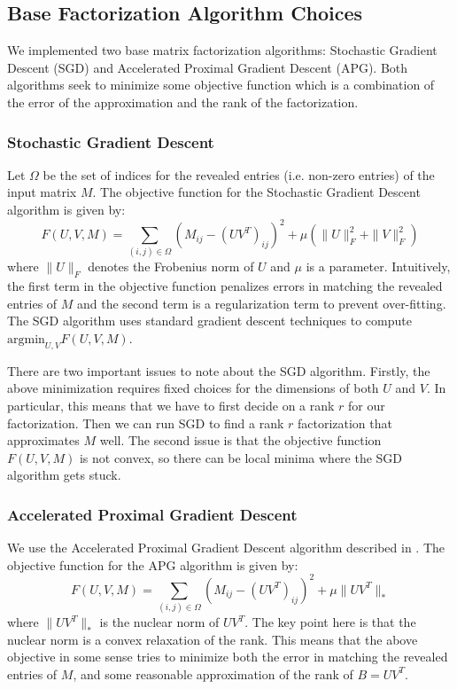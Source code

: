 \subsection{Base Factorization Algorithm Choices}
We implemented two base matrix factorization algorithms: Stochastic Gradient Descent (SGD) and Accelerated Proximal Gradient Descent (APG). Both algorithms seek to minimize some objective function which is a combination of the error of the approximation and the rank of the factorization.
\subsubsection{Stochastic Gradient Descent}
Let $\Omega$ be the set of indices for the revealed entries (i.e. non-zero entries) of the input matrix $M$. The objective function for the Stochastic Gradient Descent algorithm is given by:
\[
F(U,V,M) = \sum_{(i,j)\in \Omega} \left(M_{ij} - (UV^T)_{ij}\right)^2 + \mu (\| U\|^2_F  + \| V\|^2_F)
\]
where $\|U\|_F$ denotes the Frobenius norm of $U$ and $\mu$ is a parameter. Intuitively, the first term in the objective function penalizes errors in matching the revealed entries of $M$ and the second term is a regularization term to prevent over-fitting. The SGD algorithm uses standard gradient descent techniques to compute $\mbox{argmin}_{U,V} F(U,V,M)$. 

There are two important issues to note about the SGD algorithm. Firstly, the above minimization requires fixed choices for the dimensions of both $U$ and $V$. In particular, this means that we have to first decide on a rank $r$ for our factorization. Then we can run SGD to find a rank $r$ factorization that approximates $M$ well. The second issue is that the objective function $F(U,V,M)$ is not convex, so there can be local minima where the SGD algorithm gets stuck.

\subsubsection{Accelerated Proximal Gradient Descent}
We use the Accelerated Proximal Gradient Descent algorithm described in \cite{APGPaper}. The objective function for the APG algorithm is given by:
\[
F(U,V,M) = \sum_{(i,j)\in \Omega} \left(M_{ij} - (UV^T)_{ij}\right)^2 + \mu \| UV^T\|_*
\]
where $\|UV^T\|_*$ is the nuclear norm of $UV^T$. The key point here is that the nuclear norm is a convex relaxation of the rank. This means that the above objective in some sense tries to minimize both the error in matching the revealed entries of $M$, and some reasonable approximation of the rank of $B=UV^T$.

